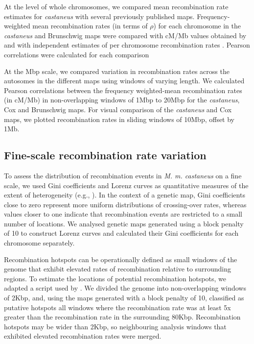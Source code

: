 At the level of whole chromosomes, we compared mean recombination rate estimates for \textit{castaneus} with several previously published maps. Frequency-weighted mean recombination rates (in terms of $\rho$) for each chromosome in the \textit{castaneus} and Brunschwig maps were compared with cM/Mb values obtained by \cite{RN232} and with independent estimates of per chromosome recombination rates \citep{RN184}. Pearson correlations were calculated for each comparison 
 
At the Mbp scale, we compared variation in recombination rates across the autosomes in the different maps using windows of varying length. We calculated Pearson correlations between the frequency weighted-mean recombination rates (in cM/Mb) in non-overlapping windows of 1Mbp to 20Mbp for the \textit{castaneus}, Cox and Brunschwig maps. For visual comparison of the \textit{castaneus} and Cox maps, we plotted recombination rates in sliding windows of 10Mbp, offset by 1Mb. 

\subsection{Fine-scale recombination rate variation}

To assess the distribution of recombination events in \textit{M. m. castaneus} on a fine scale, we used Gini coefficients and Lorenz curves as quantitative measures of the extent of heterogeneity (e.g., \citealt{RN333}). In the context of a genetic map, Gini coefficients close to zero represent more uniform distributions of crossing-over rates, whereas values closer to one indicate that recombination events are restricted to a small number of locations. We analysed genetic maps generated using a block penalty of 10 to construct Lorenz curves and calculated their Gini coefficients for each chromosome separately.

	Recombination hotspots can be operationally defined as small windows of the genome that exhibit elevated rates of recombination relative to surrounding regions. To estimate the locations of potential recombination hotspots, we adapted a script used by \cite{RN258}. We divided the genome into non-overlapping windows of 2Kbp, and, using the maps generated with a block penalty of 10, classified as putative hotspots all windows where the recombination rate was at least 5x greater than the recombination rate in the surrounding 80Kbp. Recombination hotspots may be wider than 2Kbp, so neighbouring analysis windows that exhibited elevated recombination rates were merged.

